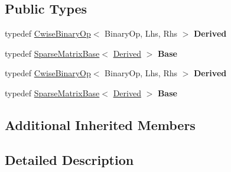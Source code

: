 \subsection*{Public Types}
\begin{DoxyCompactItemize}
\item 
\mbox{\label{class_eigen_1_1_cwise_binary_op_impl_3_01_binary_op_00_01_lhs_00_01_rhs_00_01_sparse_01_4_a3d5deb540c9c642dbe4fe63e8e320f20}} 
typedef \hyperlink{group___core___module_class_eigen_1_1_cwise_binary_op}{Cwise\+Binary\+Op}$<$ Binary\+Op, Lhs, Rhs $>$ {\bfseries Derived}
\item 
\mbox{\label{class_eigen_1_1_cwise_binary_op_impl_3_01_binary_op_00_01_lhs_00_01_rhs_00_01_sparse_01_4_aada7e73dfed941e90490e5ea3e1de602}} 
typedef \hyperlink{group___sparse_core___module_class_eigen_1_1_sparse_matrix_base}{Sparse\+Matrix\+Base}$<$ \hyperlink{group___core___module_class_eigen_1_1_cwise_binary_op}{Derived} $>$ {\bfseries Base}
\item 
\mbox{\label{class_eigen_1_1_cwise_binary_op_impl_3_01_binary_op_00_01_lhs_00_01_rhs_00_01_sparse_01_4_a3d5deb540c9c642dbe4fe63e8e320f20}} 
typedef \hyperlink{group___core___module_class_eigen_1_1_cwise_binary_op}{Cwise\+Binary\+Op}$<$ Binary\+Op, Lhs, Rhs $>$ {\bfseries Derived}
\item 
\mbox{\label{class_eigen_1_1_cwise_binary_op_impl_3_01_binary_op_00_01_lhs_00_01_rhs_00_01_sparse_01_4_aada7e73dfed941e90490e5ea3e1de602}} 
typedef \hyperlink{group___sparse_core___module_class_eigen_1_1_sparse_matrix_base}{Sparse\+Matrix\+Base}$<$ \hyperlink{group___core___module_class_eigen_1_1_cwise_binary_op}{Derived} $>$ {\bfseries Base}
\end{DoxyCompactItemize}
\subsection*{Additional Inherited Members}


\subsection{Detailed Description}
